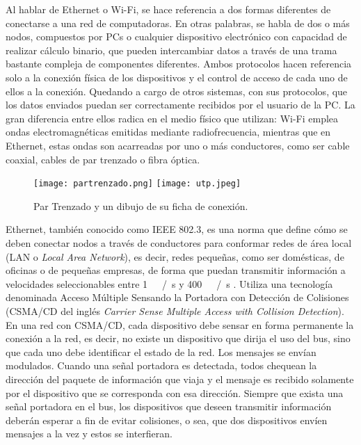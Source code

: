 Al hablar de Ethernet o Wi-Fi, se hace referencia a dos formas diferentes de conectarse a una red de computadoras. En otras palabras, se habla de dos o más nodos, compuestos por PCs o cualquier dispositivo electrónico con capacidad de realizar cálculo binario, que pueden intercambiar datos a través de una trama bastante compleja de componentes diferentes. Ambos protocolos hacen referencia solo a la conexión física de los dispositivos y el control de acceso de cada uno de ellos a la conexión. Quedando a cargo de otros sistemas, con sus protocolos, que los datos enviados puedan ser correctamente recibidos por el usuario de la PC. La gran diferencia entre ellos radica en el medio físico que utilizan: Wi-Fi emplea ondas electromagnéticas emitidas mediante radiofrecuencia, mientras que en Ethernet, estas ondas son acarreadas por uno o más conductores, como ser cable coaxial, cables de par trenzado o fibra óptica.\\

\begin{figure}
	\centering
	\texttt{[image: partrenzado.png]}
	\texttt{[image: utp.jpeg]}
	\caption{Par Trenzado y un dibujo de su ficha de conexión.}
	\label{fig:utp}
\end{figure}

Ethernet, también conocido como IEEE 802.3, es una norma que define cómo se deben conectar nodos a través de conductores para conformar redes de área local (LAN o {\it Local Area Network}), es decir, redes pequeñas, como ser domésticas, de oficinas o de pequeñas empresas, de forma que puedan transmitir información a velocidades seleccionables entre \SI{1}{\mega\bit\slash\second} y \SI{400}{\giga\bit\slash\second} \cite{Ethernet2018}. Utiliza una tecnología denominada Acceso Múltiple Sensando la Portadora con Detección de Colisiones (CSMA/CD del inglés {\it Carrier Sense Multiple Access with Collision Detection}). En una red con CSMA/CD, cada dispositivo debe sensar en forma permanente la conexión a la red, es decir, no existe un dispositivo que dirija el uso del bus, sino que cada uno debe identificar el estado de la red. Los mensajes se envían modulados. Cuando una señal portadora es detectada, todos chequean la dirección del paquete de información que viaja y el mensaje es recibido solamente por el dispositivo que se corresponda con esa dirección. Siempre que exista una señal portadora en el bus, los dispositivos que deseen transmitir información deberán esperar a fin de evitar colisiones, o sea, que dos dispositivos envíen mensajes a la vez y estos se interfieran.\\

